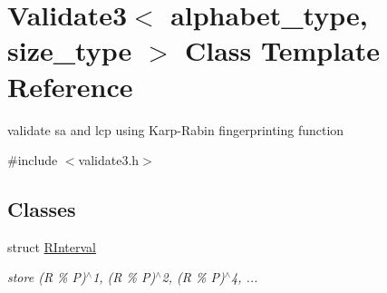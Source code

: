 \hypertarget{class_validate3}{}\section{Validate3$<$ alphabet\+\_\+type, size\+\_\+type $>$ Class Template Reference}
\label{class_validate3}


validate sa and lcp using Karp-\/\+Rabin fingerprinting function  




{\ttfamily \#include $<$validate3.\+h$>$}

\subsection*{Classes}
\begin{DoxyCompactItemize}
\item 
struct \hyperlink{struct_validate3_1_1_r_interval}{R\+Interval}
\begin{DoxyCompactList}\small\item\em store (R \% P)$^\wedge$1, (R \% P)$^\wedge$2, (R \% P)$^\wedge$4, ... \end{DoxyCompactList}\end{DoxyCompactItemize}
